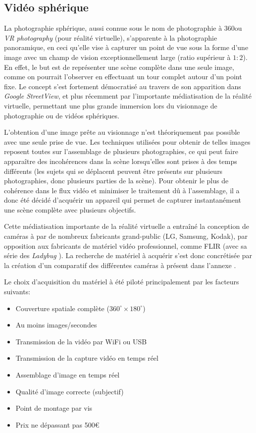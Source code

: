 		\subsection{Vidéo sphérique}
			La photographie sphérique, aussi connue sous le nom de photographie à 360\degre ou \emph{VR photography} (pour réalité virtuelle), s'apparente à la photographie panoramique, en ceci qu'elle vise à capturer un point de vue sous la forme d'une image avec un champ de vision exceptionnellement large (ratio supérieur à $1:2$)\cite{fnumpano}. En effet, le but est de représenter une scène complète dans une seule image, comme on pourrait l'observer en effectuant un tour complet autour d'un point fixe. Le concept s'est fortement démocratisé au travers de son apparition dans \emph{Google StreetView}, et plus récemment par l'importante médiatisation de la réalité virtuelle, permettant une plus grande immersion lors du visionnage de photographie ou de vidéos sphériques.
			\par
			L'obtention d'une image prête au visionnage n'est théoriquement pas possible avec une seule prise de vue. Les techniques utilisées pour obtenir de telles images reposent toutes sur l'assemblage de plusieurs photographies, ce qui peut faire apparaître des incohérences dans la scène lorsqu'elles sont prises à des temps différents (les sujets qui se déplacent peuvent être présents sur plusieurs photographies, donc plusieurs parties de la scène). Pour obtenir le plus de cohérence dans le flux vidéo et minimiser le traitement dû à l'assemblage, il a donc été décidé d'acquérir un appareil qui permet de capturer instantanément une scène complète avec plusieurs objectifs.
			\par
			Cette médiatisation importante de la réalité virtuelle a entraîné la conception de caméras à \degre par de nombreux fabricants grand-public (LG, Samsung, Kodak), par opposition aux fabricants de matériel vidéo professionnel, comme FLIR (avec sa série des \emph{Ladybug} \cite{ladybug}). La recherche de matériel à acquérir s'est donc concrétisée par la création d'un comparatif des différentes caméras à \degre présent dans l'annexe \todoref.
			
			Le choix d'acquisition du matériel à été piloté principalement par les facteurs suivants:
			\begin{itemize}[noitemsep]
				\item Couverture spatiale complète ($360^{\circ}\times180^{\circ}$)
				\item Au moins  images/secondes
				\item Transmission de la vidéo par WiFi ou USB
				\item Transmission de la capture vidéo en temps réel
				\item Assemblage d'image en temps réel
				\item Qualité d'image correcte (subjectif)
				\item Point de montage par vis
				\item Prix ne dépassant pas 500\euro
			\end{itemize}
			
